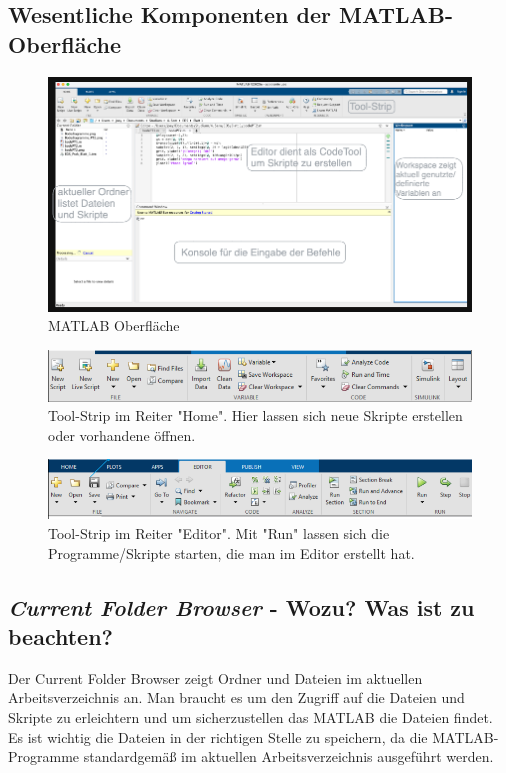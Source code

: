\documentclass{article}
\begin{document}
		\subsection{Wesentliche Komponenten der MATLAB-Oberfläche}
			\begin{figure}[h]
				\includegraphics[scale=0.4]{./MATLAB_Oberflaeche_1_b.png}
				\caption{MATLAB Oberfläche}
				\label{fig1: MATLABOberflaeche}
			\end{figure}
	\newpage
			\begin{figure}
				\includegraphics[scale=0.45]{./TOOLStirp.png}
				\caption{Tool-Strip im Reiter "Home". Hier lassen sich neue Skripte erstellen oder vorhandene öffnen.}
				\label{fig2: ToolStrip_Home}
			\end{figure}		

			\begin{figure}
				\includegraphics[scale=0.45]{./TOOLStrip_Editor.png}
				\caption{Tool-Strip im Reiter "Editor". Mit "Run" lassen sich die Programme/Skripte starten, die man im Editor erstellt hat.}
				\label{fig3: ToolStrip_Editor}
			\end{figure}	
		
		\subsection{\textit{Current Folder Browser} - Wozu? Was ist zu beachten?}
			Der Current Folder Browser zeigt Ordner und Dateien im aktuellen Arbeitsverzeichnis an. Man braucht es um den Zugriff auf die Dateien und Skripte zu erleichtern und um sicherzustellen das MATLAB die Dateien findet. Es ist wichtig die Dateien in der richtigen Stelle zu speichern, da die MATLAB-Programme standardgemäß im aktuellen Arbeitsverzeichnis ausgeführt werden. 
		
\end{document}
